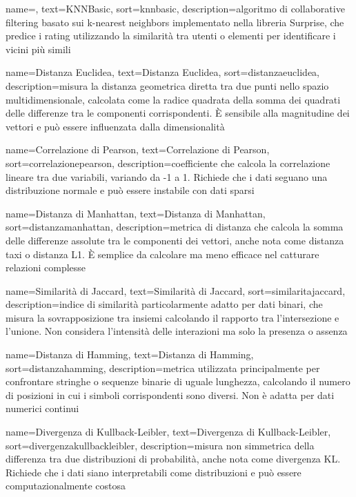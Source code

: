  {
    name=,
    text=KNNBasic,
    sort=knnbasic,
    description={algoritmo di collaborative filtering basato sui k-nearest neighbors implementato nella libreria Surprise, che predice i rating utilizzando la similarità tra utenti o elementi per identificare i vicini più simili}
}

 {
    name=Distanza Euclidea,
    text=Distanza Euclidea,
    sort=distanzaeuclidea,
    description={misura la distanza geometrica diretta tra due punti nello spazio multidimensionale, calcolata come la radice quadrata della somma dei quadrati delle differenze tra le componenti corrispondenti. È sensibile alla magnitudine dei vettori e può essere influenzata dalla dimensionalità}
}

 {
    name=Correlazione di Pearson,
    text=Correlazione di Pearson,
    sort=correlazionepearson,
    description={coefficiente che calcola la correlazione lineare tra due variabili, variando da -1 a 1. Richiede che i dati seguano una distribuzione normale e può essere instabile con dati sparsi}
}

 {
    name=Distanza di Manhattan,
    text=Distanza di Manhattan,
    sort=distanzamanhattan,
    description={metrica di distanza che calcola la somma delle differenze assolute tra le componenti dei vettori, anche nota come distanza taxi o distanza L1. È semplice da calcolare ma meno efficace nel catturare relazioni complesse}
}

 {
    name=Similarità di Jaccard,
    text=Similarità di Jaccard,
    sort=similaritajaccard,
    description={indice di similarità particolarmente adatto per dati binari, che misura la sovrapposizione tra insiemi calcolando il rapporto tra l'intersezione e l'unione. Non considera l'intensità delle interazioni ma solo la presenza o assenza}
}

 {
    name=Distanza di Hamming,
    text=Distanza di Hamming,
    sort=distanzahamming,
    description={metrica utilizzata principalmente per confrontare stringhe o sequenze binarie di uguale lunghezza, calcolando il numero di posizioni in cui i simboli corrispondenti sono diversi. Non è adatta per dati numerici continui}
}

 {
    name=Divergenza di Kullback-Leibler,
    text=Divergenza di Kullback-Leibler,
    sort=divergenzakullbackleibler,
    description={misura non simmetrica della differenza tra due distribuzioni di probabilità, anche nota come divergenza KL. Richiede che i dati siano interpretabili come distribuzioni e può essere computazionalmente costosa}
}

